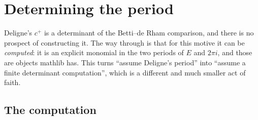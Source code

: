 \section{Determining the period}
\label{sec:sympow-period}

Deligne's $c^{+}$ is a determinant of the Betti--de Rham comparison, and there is no prospect
of constructing it. The way through is that for this motive it can be \emph{computed}: it is
an explicit monomial in the two periods of $E$ and $2\pi i$, and those are objects mathlib
has. This turns ``assume Deligne's period'' into ``assume a finite determinant computation'',
which is a different and much smaller act of faith.

\subsection{The computation}

